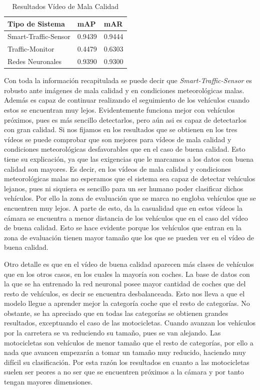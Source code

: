 \begin{table}[H] 
\begin{center}
\begin{tabular}{|l|l|l|}
\hline
Tipo de Sistema & mAP & mAR  \\ 
\hline \hline
Smart-Traffic-Sensor & 0.9439 & 0.9444 \\ \hline
Traffic-Monitor & 0.4479 & 0.6303 \\ \hline
Redes Neuronales & 0.9390 & 0.9300\\ \hline
\end{tabular}
\caption{Resultados Vídeo de Mala Calidad}
\label{resultados_video_mala_calidad}
\end{center}
\end{table}

Con toda la información recapitulada se puede decir que \textit{Smart-Traffic-Sensor} es robusto ante imágenes de mala calidad y en condiciones meteorológicas malas. Además es capaz de continuar realizando el seguimiento de los vehículos cuando estos se encuentran muy lejos.
Evidentemente funciona mejor con vehículos próximos, pues es más sencillo detectarlos, pero aún asi es  capaz de detectarlos con gran calidad. Si nos fijamos en los resultados que se obtienen en los tres vídeos se puede comprobar que son mejores para vídeos de mala calidad y condiciones meteorológicas desfavorables que en el caso de buena calidad. Esto tiene su explicación, ya que las exigencias que le marcamos a los datos con buena calidad son mayores. Es decir, en los vídeos de mala calidad y condiciones meteorológicas malas  no esperamos que el sistema sea capaz de detectar vehículos lejanos, pues ni siquiera es sencillo para un ser humano poder clasificar dichos vehículos. Por ello la zona de evaluación que se marca no engloba vehículos que se encuentren muy lejos. A parte de esto, da la casualidad que en estos vídeos la cámara se encuentra a menor distancia de los vehículos que en el caso del vídeo de buena calidad. Esto se hace evidente porque los vehículos que entran en la zona de evaluación tienen mayor tamaño que los que se pueden ver en el vídeo de buena calidad.

Otro detalle es que en el vídeo de buena calidad aparecen más clases de vehículos que en los otros casos, en los cuales la mayoría son coches. La base de datos con la que se ha entrenado la red neuronal posee mayor cantidad de coches que del resto de vehículos, es decir se encuentra desbalanceada. Esto nos lleva a que el modelo llegue a aprender mejor la categoría coche que el resto de categorías. No obstante, se ha apreciado que en todas las categorías se obtienen grandes resultados, exceptuando el caso de las motocicletas. Cuando avanzan los vehículos por la carretera se va reduciendo su tamaño, pues se van alejando. Las motocicletas son vehículos de menor tamaño que el resto de categorías, por ello a nada que avancen empezarán a tomar un tamaño muy reducido, haciendo muy difícil su clasificación. Por esta razón los resultados en cuanto a las motocicletas suelen ser peores a no ser que se encuentren próximos a la cámara y por tanto tengan mayores dimensiones.


